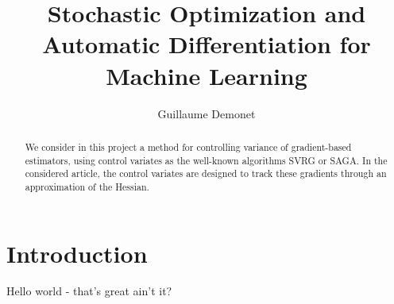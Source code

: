 \documentclass{article}
\begin{document}
\title{Stochastic Optimization and Automatic Differentiation for Machine Learning}
\author{Guillaume Demonet}

\maketitle

\begin{abstract}
We consider in this project a method for controlling variance of gradient-based
estimators, using control variates as the well-known algorithms SVRG or SAGA.
In the considered article, the control variates are designed to track these
gradients through an approximation of the Hessian.
\end{abstract}

\section*{Introduction}

Hello world - that's great ain't it?
\end{document}
